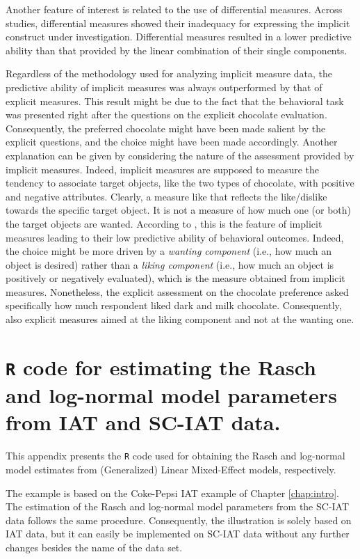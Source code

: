 \documentclass[12pt]{book}
\begin{document}
Another feature of interest is related to the use of differential measures. 
Across studies, differential measures showed their inadequacy for expressing the implicit construct under investigation. Differential measures resulted in a lower predictive ability than that provided by the linear combination of their single components. 


Regardless of the methodology used for analyzing implicit measure data, the predictive ability of implicit measures was always outperformed by that of explicit measures. 
This result might be due to the fact that the behavioral task was presented right after the questions on the explicit chocolate evaluation. Consequently, the preferred chocolate might have been made salient by the explicit questions, and the choice might have been made accordingly. 
Another explanation can be given by considering the nature of the assessment provided by implicit measures. 
Indeed, implicit measures are supposed to measure the tendency to associate target objects, like the two types of chocolate, with positive and negative attributes. Clearly, a measure like that reflects the like/dislike towards the specific target object. It is not a measure of how much one (or both) the target objects are wanted. According to , this is the feature of implicit measures leading to their low predictive ability of behavioral outcomes. 
Indeed, the choice might be more driven by a \emph{wanting component }(i.e., how much an object is desired) rather than a \emph{liking component} (i.e., how much an object is positively or negatively evaluated), which is the measure obtained from implicit measures. 
Nonetheless, the explicit assessment on the chocolate preference asked specifically how much respondent liked dark and milk chocolate. Consequently, also explicit measures aimed at the liking component and not at the wanting one. 

\appendix

\chapter[Appendix A]{\texttt{R} code for estimating the Rasch and log-normal model parameters from IAT and SC-IAT data.} \label{chap:appendixA}

This appendix presents the \verb*|R| code used for obtaining the Rasch and log-normal model estimates from (Generalized) Linear Mixed-Effect models, respectively.

The example is based on the Coke-Pepsi IAT example of Chapter \ref{chap:intro}. 
The estimation of the Rasch and log-normal model parameters from the SC-IAT data follows the same procedure. 
Consequently, the illustration is solely based on IAT data, but it can easily be implemented on SC-IAT data without any further changes besides the name of the data set.
\end{document}
